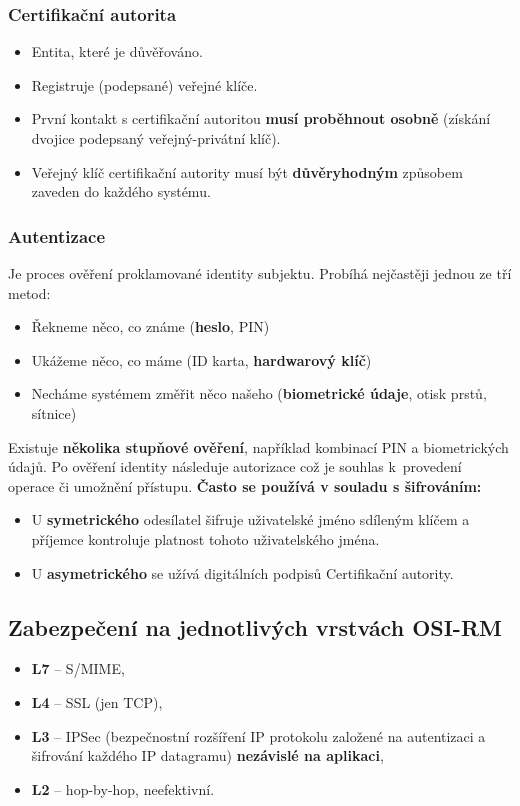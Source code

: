 \subsubsection{Certifikační autorita}
\begin{itemize}
	\item Entita, které je důvěřováno.
	\item Registruje (podepsané) veřejné klíče.
	\item První kontakt s certifikační autoritou \textbf{musí proběhnout osobně }(získání dvojice podepsaný veřejný-privátní klíč).
	\item Veřejný klíč certifikační autority musí být \textbf{důvěryhodným} způsobem zaveden do každého systému.
\end{itemize}


\subsubsection{Autentizace}
Je proces ověření proklamované identity subjektu. Probíhá nejčastěji jednou ze tří metod:
\begin{itemize}
\item Řekneme něco, co známe (\textbf{heslo}, PIN)
\item Ukážeme něco, co máme (ID karta, \textbf{hardwarový klíč})
\item Necháme systémem změřit něco našeho (\textbf{biometrické údaje}, otisk prstů, sítnice)
\end{itemize}
Existuje \textbf{několika stupňové ověření}, například kombinací PIN a biometrických údajů. Po ověření identity následuje autorizace což je souhlas k provedení operace či umožnění přístupu. \textbf{Často se používá v souladu s šifrováním:}
\begin{itemize}
\item U \textbf{symetrického} odesílatel šifruje uživatelské jméno sdíleným klíčem a příjemce kontroluje platnost tohoto uživatelského jména.
\item U \textbf{asymetrického} se užívá digitálních podpisů Certifikační autority.
\end{itemize}



\subsection{Zabezpečení na jednotlivých vrstvách OSI-RM }
\begin{itemize}
	\item \textbf{L7} – S/MIME,
	\item \textbf{L4} – SSL (jen TCP),
	\item \textbf{L3} – IPSec (bezpečnostní rozšíření IP protokolu založené na autentizaci a šifrování každého IP datagramu) \textbf{nezávislé na aplikaci},
	\item \textbf{L2} – hop-by-hop, neefektivní.
\end{itemize}



